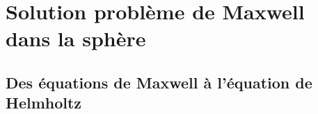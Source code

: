 \section{Solution problème de Maxwell dans la sphère}
\label{sec:sol_maxwell}





\subsection{Des équations de Maxwell à l'équation de Helmholtz}
% 
% 

